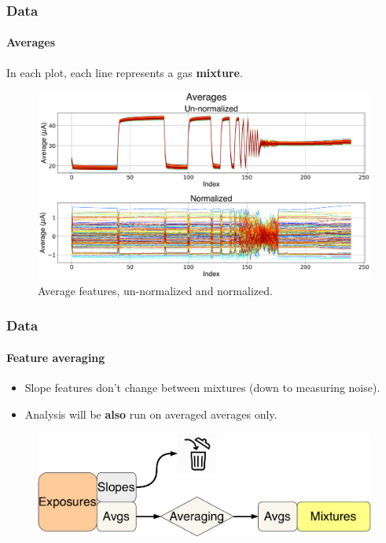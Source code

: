 \documentclass{beamer}
\begin{document}
\begin{frame}
		\frametitle{Data}
	\framesubtitle{Averages}
		In each plot, each line represents a gas \textbf{mixture}.
	\begin{figure}[b]
		\includegraphics[width=1\linewidth]{../../figures/averages.png}
		\caption{Average features, un-normalized and normalized.}
		\label{fig:averages}
	\end{figure}
\end{frame}

\begin{frame}
	\frametitle{Data}
	\framesubtitle{Feature averaging}
	
	\begin{itemize}
		\item Slope features don't change between mixtures (down to measuring noise).
		\item Analysis will be \textbf{also} run on averaged averages only.
	\end{itemize}

	\begin{figure}[b]
	\includegraphics[width=1\linewidth]{../../figures/exp-mix.pdf}
	\end{figure}

	
\end{frame}
		
\end{document}

